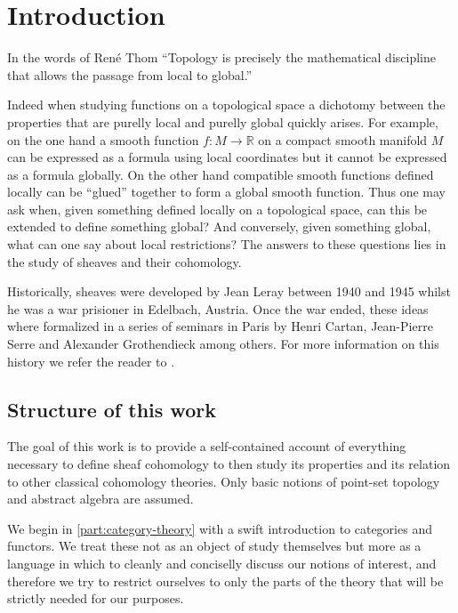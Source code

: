 \documentclass[../../main]{subfiles}
\begin{document}
\chapter*{Introduction}

In the words of René Thom ``Topology is precisely the mathematical discipline that allows the passage from local to global.''

Indeed when studying functions on a topological space a dichotomy between the properties that are purelly local and purelly global quickly arises.
For example, on the one hand a smooth function \(f\colon M \to \mathbb{R}\) on a compact smooth manifold \(M\) can be expressed as a formula using local coordinates but it cannot be expressed as a formula globally.
On the other hand compatible smooth functions defined locally can be ``glued'' together to form a global smooth function.
Thus one may ask when, given something defined locally on a topological space, can this be extended to define something global? And conversely, given something global, what can one say about local restrictions?
The answers to these questions lies in the study of sheaves and their cohomology.

Historically, sheaves were developed by Jean Leray between 1940 and 1945 whilst he was a war prisioner in Edelbach, Austria.
Once the war ended, these ideas where formalized in a series of seminars in Paris by Henri Cartan, Jean-Pierre Serre and Alexander Grothendieck among others.
For more information on this history we refer the reader to \cite{dieudonneHistoryAlgebraicDifferential2009, kashiwaraSheavesManifolds1990}.

\section*{Structure of this work}

The goal of this work is to provide a self-contained account of everything necessary to define sheaf cohomology to then study its properties and its relation to other classical cohomology theories.
Only basic notions of point-set topology and abstract algebra are assumed.

We begin in \autoref{part:category-theory} with a swift introduction to categories and functors.
We treat these not as an object of study themselves but more as a language in which to cleanly and conciselly discuss our notions of interest, and therefore we try to restrict ourselves to only the parts of the theory that will be strictly needed for our purposes.
\end{document}
